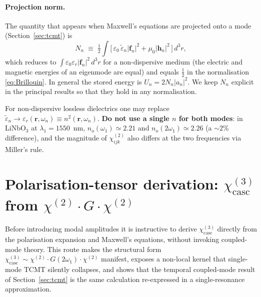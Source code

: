 \documentclass[11pt,a4paper]{article}
\newcommand{\eps}{\varepsilon}
\newcommand{\epstilde}{\widetilde{\varepsilon}}
\newcommand{\bvec}[1]{\mathbf{#1}}
\newcommand{\f}{\bvec{f}}
\newcommand{\h}{\bvec{h}}
\newcommand{\ri}{\bvec{r}}
\newcommand{\dthreer}{\,d^{3}r}
\newcommand{\chitwo}{\chi^{(2)}}
\newcommand{\chithree}{\chi^{(3)}}
\begin{document}
\paragraph{Projection norm.}  The quantity that appears when Maxwell's
equations are projected onto a mode (Section~\ref{sec:tcmt}) is
\begin{equation}
  N_n\;\equiv\;\tfrac12\!\int\!\!\bigl[\,\eps_0\,\epstilde_n|\f_n|^2+\mu_0|\h_n|^2\,\bigr]\dthreer ,
  \label{eq:Nn}
\end{equation}
which reduces to $\int\eps_0\eps_r|\f_n|^2\dthreer$ for a non-dispersive
medium (the electric and magnetic energies of an eigenmode are equal) and
equals $\tfrac12$ in the normalisation \eqref{eq:Brillouin}.  In general
the stored energy is $U_n=2N_n|a_n|^2$.  We keep $N_n$ explicit in the
principal results so that they hold in any normalisation.

For non-dispersive lossless dielectrics one may replace
$\epstilde_n\to\eps_r(\ri,\omega_n)\equiv n^2(\ri,\omega_n)$.
\textbf{Do not use a single $n$ for both modes}: in LiNbO$_3$ at
$\lambda_1=1550$~nm, $n_o(\omega_1)\simeq 2.21$ and $n_o(2\omega_1)\simeq 2.26$
(a $\sim 2\%$ difference), and the magnitude of $\chitwo_{ijk}$ also
differs at the two frequencies via Miller's rule.

\section{Polarisation-tensor derivation: $\chithree_{\text{casc}}$ from $\chitwo\!\cdot G\!\cdot\chitwo$}\label{sec:tensorder}

Before introducing modal amplitudes it is instructive to derive
$\chithree_{\text{casc}}$ directly from the polarisation expansion and
Maxwell's equations, without invoking coupled-mode theory.  This route
makes the structural form
$\chithree_{\text{casc}}\sim\chitwo\!\cdot G(2\omega_1)\!\cdot\chitwo$
manifest, exposes a non-local kernel that single-mode TCMT silently
collapses, and shows that the temporal coupled-mode result of
Section~\ref{sec:tcmt} is the same calculation re-expressed in a
single-resonance approximation.
\end{document}
